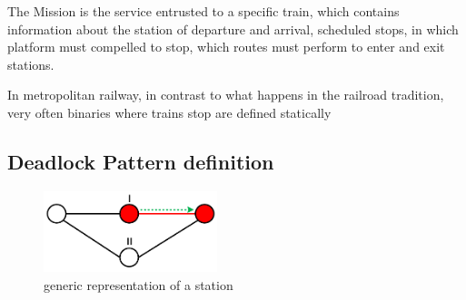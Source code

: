 \documentclass{ewic}
\begin{document}
The Mission is the service entrusted to a specific train, which contains information about the station of departure and arrival, scheduled stops, in which platform must compelled to stop, which routes must perform to enter and exit stations.
 


In metropolitan railway, in contrast to what happens in the railroad tradition, very often binaries where trains stop are defined statically
 



 



\subsection{Deadlock Pattern definition}

\begin{figure}[htp]
	\begin{centering}	
	\includegraphics[width=0.45\textwidth, clip]{img/rappresentazione}
	\caption{generic representation of a station}
	\label{fig:rappresent}
	\end{centering}
\end{figure}
\end{document}
